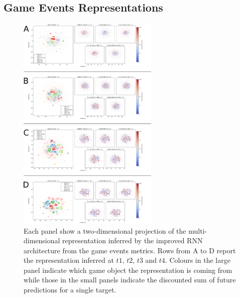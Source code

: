 \subsection{Game Events Representations}
\begin{figure}[!htb]
\includegraphics[width=0.6\textwidth]{images/appendix_D/rnn_full_even_umap.png}
\centering
\caption[\textbf{Lower dimensional representation of the latent representations generated by the improved RNN architecture from the game events metrics}]{Each panel show a two-dimensional projection of the multi-dimensional representation inferred by the improved RNN architecture from the game events metrics. Rows from A to D report the representation inferred at $t1$, $t2$, $t3$ and $t4$. Colours in the large panel indicate which game object the representation is coming from while those in the small panels indicate the discounted sum of future predictions for a single target.}
\end{figure}
\FloatBarrier

